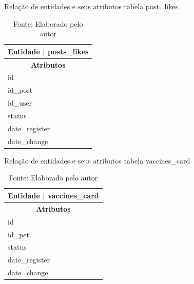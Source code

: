 \begin{table}[htb]
  \centering
  \caption{Relação de entidades e seus atributos tabela post\_likes}
  \begin{tabular}{|p{4cm}|}
    \hline
    \multicolumn{2}{|c|}{\textbf{Entidade} | \textbf{posts\_likes}} \\
    \hline
    \multicolumn{1}{|c|}{\textbf{Atributos}} \\
    \hline
    id \\
    \hline
    id\_post \\
    \hline
    id\_user \\
    \hline
    status \\
    \hline
    date\_register \\
    \hline
    date\_change \\
    \hline
  \end{tabular}
  \caption*{\small Fonte: Elaborado pelo autor}
  \label{tab:Plataformas1}
\end{table}

\begin{table}[htb]
  \centering
  \caption{Relação de entidades e seus atributos tabela vaccines\_card}
  \begin{tabular}{|p{4cm}|}
    \hline
    \multicolumn{2}{|c|}{\textbf{Entidade} | \textbf{vaccines\_card}} \\
    \hline
    \multicolumn{1}{|c|}{\textbf{Atributos}} \\
    \hline
    id \\
    \hline
    id\_pet \\
    \hline
    status \\
    \hline
    date\_register \\
    \hline
    date\_change \\
    \hline
  \end{tabular}
  \caption*{\small Fonte: Elaborado pelo autor}
  \label{tab:Plataformas1}
\end{table}

